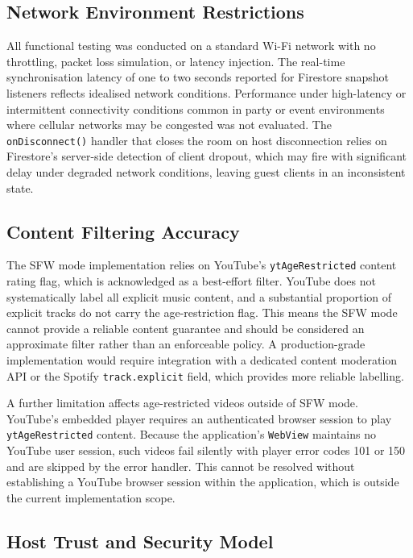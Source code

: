 \documentclass[pdflatex,sn-mathphys-num,iicol]{sn-jnl}
\theoremstyle{thmstyleone}%
\theoremstyle{thmstyletwo}%
\theoremstyle{thmstylethree}%
\begin{document}
\subsection{Network Environment Restrictions}

All functional testing was conducted on a standard Wi-Fi network with no throttling, packet loss simulation, or latency injection. The real-time synchronisation latency of one to two seconds reported for Firestore snapshot
listeners reflects idealised network conditions. Performance under high-latency
or intermittent connectivity conditions common in party or event environments
where cellular networks may be congested was not evaluated. The
\texttt{onDisconnect()} handler that closes the room on host disconnection
relies on Firestore's server-side detection of client dropout, which may fire
with significant delay under degraded network conditions, leaving guest clients
in an inconsistent state.

\subsection{Content Filtering Accuracy}

The SFW mode implementation relies on YouTube's \texttt{ytAgeRestricted} content
rating flag, which is acknowledged as a best-effort filter. YouTube does not
systematically label all explicit music content, and a substantial proportion of
explicit tracks do not carry the age-restriction flag. This means the SFW mode
cannot provide a reliable content guarantee and should be considered an
approximate filter rather than an enforceable policy. A production-grade
implementation would require integration with a dedicated content moderation
API or the Spotify \texttt{track.explicit} field, which provides more reliable
labelling.

A further limitation affects age-restricted videos outside of SFW mode. YouTube's
embedded player requires an authenticated browser session to play
\texttt{ytAgeRestricted} content. Because the application's \texttt{WebView} maintains
no YouTube user session, such videos fail silently with player error codes 101 or 150
and are skipped by the error handler. This cannot be resolved without establishing a
YouTube browser session within the application, which is outside the current
implementation scope.

\subsection{Host Trust and Security Model}
\end{document}
